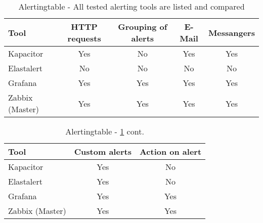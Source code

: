 \begin{table}
	\centering
	
	\label{tab:Alerting}
	\begin{tabular}{lcccc}
		\hline
Tool & HTTP requests & Grouping of alerts         & E-Mail                      & Messangers \\
\hline
Kapacitor                    & Yes           & No & Yes                         & Yes \\
Elastalert & No & No & No & No \\
Grafana                      & Yes           & Yes                        & Yes & Yes \\
Zabbix (Master)              & Yes           & Yes                        & Yes                         & Yes \\
		\hline
	\end{tabular}
	\caption{Alertingtable - All tested alerting tools are listed and compared}
\end{table}

\begin{table}
	\centering
	
	\label{tab:Alertingcont}
	\begin{tabular}{lcc}
		\hline
		Tool & Custom alerts & Action on alert \\
		\hline
		Kapacitor                    & Yes           & No              \\
		Elastalert                   & Yes           & No              \\
		Grafana                      & Yes           & Yes             \\
		Zabbix (Master)              & Yes           & Yes           \\
		\hline 
	\end{tabular}
	\caption{Alertingtable - \cref{tab:Alerting} cont.}
\end{table}